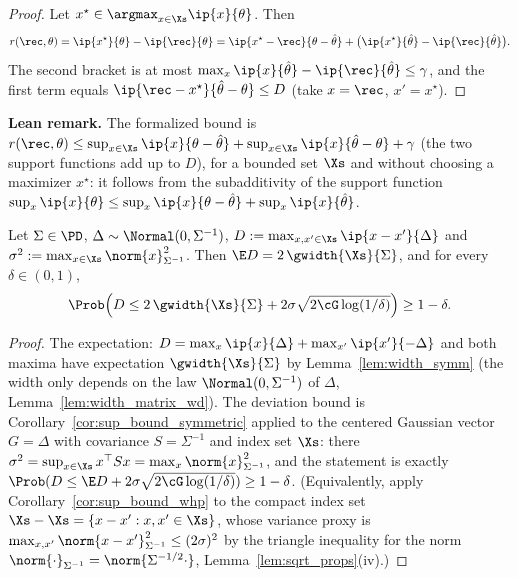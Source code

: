 \begin{proof}
\leanok
{}
Let $x^\star \in \argmax_{x\in\Xs}\ip{x}{\theta}$. Then
\[
  r(\rec,\theta) = \ip{x^\star}{\theta} - \ip{\rec}{\theta}
  = \ip{x^\star - \rec}{\theta - \hat\theta} + \big(\ip{x^\star}{\hat\theta} - \ip{\rec}{\hat\theta}\big) .
\]
The second bracket is at most $\max_x\ip{x}{\hat\theta} - \ip{\rec}{\hat\theta} \le \gamma$, and the
first term equals $\ip{\rec - x^\star}{\hat\theta - \theta} \le D$ (take $x = \rec$, $x' = x^\star$).
\end{proof}

\textbf{Lean remark.} The formalized bound is
$r(\rec,\theta) \le \sup_{x\in\Xs}\ip{x}{\theta - \hat\theta} + \sup_{x\in\Xs}\ip{x}{\hat\theta-\theta} + \gamma$
(the two support functions add up to $D$), for a bounded set $\Xs$ and without choosing a
maximizer $x^\star$: it follows from the subadditivity of the support function
$\sup_x\ip{x}{\theta} \le \sup_x\ip{x}{\theta-\hat\theta} + \sup_x\ip{x}{\hat\theta}$.

\begin{lemma}\label{lem:difference_process_concentration}
\leanok
{}
Let $\Sigma \in \PD$, $\Delta \sim \Normal(0,\Sigma^{-1})$, $D := \max_{x,x'\in\Xs}\ip{x-x'}{\Delta}$
and $\sigma^2 := \max_{x\in\Xs}\norm{x}_{\Sigma^{-1}}^2$. Then $\E D = 2\,\gwidth{\Xs}{\Sigma}$, and
for every $\delta \in (0,1)$,
\[
  \Prob\Big( D \le 2\,\gwidth{\Xs}{\Sigma} + 2\sigma\sqrt{2\cG\log(1/\delta)} \Big) \ge 1 - \delta .
\]
\end{lemma}

\begin{proof}
\leanok
{}
The expectation: $D = \max_x\ip{x}{\Delta} + \max_{x'}\ip{x'}{-\Delta}$ and both maxima have
expectation $\gwidth{\Xs}{\Sigma}$ by Lemma~\ref{lem:width_symm} (the width only depends on the
law $\Normal(0,\Sigma^{-1})$ of $\Delta$, Lemma~\ref{lem:width_matrix_wd}). The deviation bound is
Corollary~\ref{cor:sup_bound_symmetric} applied to the centered Gaussian vector $G = \Delta$ with
covariance $S = \Sigma^{-1}$ and index set $\Xs$: there $\sigma^2 = \sup_{x\in\Xs}x^\top Sx =
\max_x\norm{x}_{\Sigma^{-1}}^2$, and the statement is exactly
$\Prob(D \le \E D + 2\sigma\sqrt{2\cG\log(1/\delta)}) \ge 1-\delta$. (Equivalently, apply
Corollary~\ref{cor:sup_bound_whp} to the compact index set $\Xs - \Xs = \{x - x' : x,x'\in\Xs\}$,
whose variance proxy is $\max_{x,x'}\norm{x-x'}_{\Sigma^{-1}}^2 \le (2\sigma)^2$ by the triangle
inequality for the norm $\norm{\cdot}_{\Sigma^{-1}} = \norm{\Sigma^{-1/2}\cdot}$,
Lemma~\ref{lem:sqrt_props}(iv).)
\end{proof}

